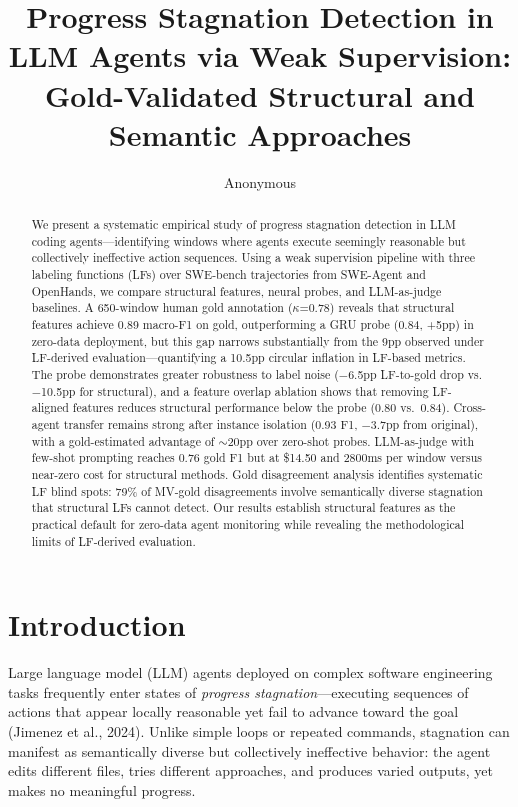 \documentclass[11pt,a4paper]{article}
\title{Progress Stagnation Detection in LLM Agents via Weak Supervision:\\Gold-Validated Structural and Semantic Approaches}
\author{Anonymous}
\date{}
\begin{document}
\maketitle

\begin{abstract}
We present a systematic empirical study of progress stagnation detection in LLM coding agents---identifying windows where agents execute seemingly reasonable but collectively ineffective action sequences.
Using a weak supervision pipeline with three labeling functions (LFs) over SWE-bench trajectories from SWE-Agent and OpenHands, we compare structural features, neural probes, and LLM-as-judge baselines.
A 650-window human gold annotation ($\kappa$=0.78) reveals that structural features achieve 0.89 macro-F1 on gold, outperforming a GRU probe (0.84, +5pp) in zero-data deployment, but this gap narrows substantially from the 9pp observed under LF-derived evaluation---quantifying a 10.5pp circular inflation in LF-based metrics.
The probe demonstrates greater robustness to label noise ($-$6.5pp LF-to-gold drop vs.\ $-$10.5pp for structural), and a feature overlap ablation shows that removing LF-aligned features reduces structural performance below the probe (0.80 vs.\ 0.84).
Cross-agent transfer remains strong after instance isolation (0.93 F1, $-$3.7pp from original), with a gold-estimated advantage of $\sim$20pp over zero-shot probes.
LLM-as-judge with few-shot prompting reaches 0.76 gold F1 but at \$14.50 and 2800ms per window versus near-zero cost for structural methods.
Gold disagreement analysis identifies systematic LF blind spots: 79\% of MV-gold disagreements involve semantically diverse stagnation that structural LFs cannot detect.
Our results establish structural features as the practical default for zero-data agent monitoring while revealing the methodological limits of LF-derived evaluation.
\end{abstract}

\section{Introduction}

Large language model (LLM) agents deployed on complex software engineering tasks frequently enter states of \emph{progress stagnation}---executing sequences of actions that appear locally reasonable yet fail to advance toward the goal (Jimenez et al., 2024).
Unlike simple loops or repeated commands, stagnation can manifest as semantically diverse but collectively ineffective behavior: the agent edits different files, tries different approaches, and produces varied outputs, yet makes no meaningful progress.
\end{document}
